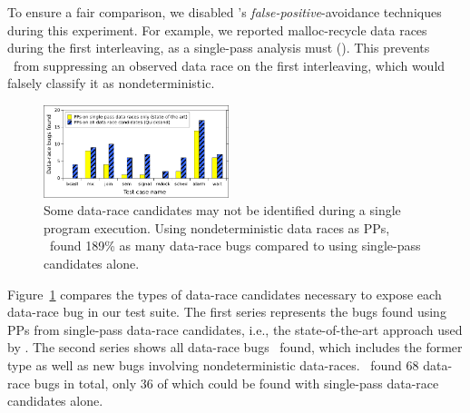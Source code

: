 To ensure a fair comparison, we disabled \landslide's {\em false-positive}-avoidance techniques during this experiment.
For example, we reported malloc-recycle data races during the first interleaving, as a single-pass analysis must
(\sect{\ref{sec:recycle}}).
This prevents \landslide~from suppressing an observed data race on the first interleaving,
which would falsely classify it as nondeterministic.

\begin{figure}[t]
	\includegraphics[width=0.48\textwidth]{nondet-drs-1-v2.pdf}
	\caption{Some data-race candidates may not be identified during a single program execution.
		Using nondeterministic data races as PPs,
		\quicksand~found 189\% as many data-race bugs compared to using single-pass candidates alone.
	}
	\label{fig:dr-falsenegs}
\end{figure}
Figure~\ref{fig:dr-falsenegs} compares the types of data-race candidates necessary to expose each data-race bug in our test suite.
The first series represents the bugs found using PPs from single-pass data-race candidates,
i.e., the state-of-the-art approach used by \cite{racefuzzer,portend}.
The second series shows all data-race bugs \quicksand~found,
which includes the former type as well as new bugs involving nondeterministic data-races.
\quicksand~found 68 data-race bugs in total, only 36 of which could be found with single-pass data-race candidates alone.


